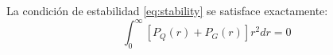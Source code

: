 \begin{remark}[Validación]
La condición de estabilidad \eqref{eq:stability} se satisface exactamente:
\begin{equation}
\int_0^\infty [P_Q(r) + P_G(r)] r^2 dr = 0
\end{equation}
\end{remark}









